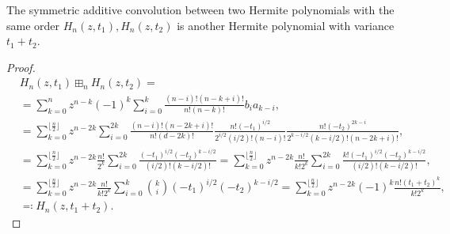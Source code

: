 \begin{proposition}
The symmetric additive convolution between two Hermite polynomials with the same order $H_n(z,t_1), H_n(z,t_2)$ is another Hermite polynomial with variance $t_1 + t_2$.
\end{proposition}

\begin{proof}
    \begin{align*}
        &H_n(z,t_1) \boxplus_n H_n(z,t_2) = \\ 
        &= \sum_{k=0}^n z^{n-k}(-1)^k \sum_{i=0}^k \frac{(n-i)!(n-k+i)!}{n!(n-k)!} b_i a_{k-i}, \\ 
        &= \sum_{k=0}^{\lfloor \frac n2 \rfloor} z^{n-2k} \sum_{i=0}^{2k} \frac{(n-i)!(n-2k+i)!}{n!(d-2k)!} \frac{n!(-t_1)^{i/2}}{2^{i/2} (i/2)! (n-i)!} \frac{n!(-t_2)^{2k-i}}{2^{k-i/2} (k-i/2)! (n-2k+i)!},\\ 
        &= \sum_{k=0}^{\lfloor \frac n2 \rfloor} z^{n-2k}\frac{n!}{2^k} \sum_{i=0}^{2k} \frac{(-t_1)^{i/2}(-t_2)^{k-i/2}}{(i/2)!(k-i/2)!} = \sum_{k=0}^{\lfloor \frac n2 \rfloor} z^{n-2k} \frac{n!}{k!2^k} \sum_{i=0}^{2k} \frac{k!(-t_1)^{i/2}(-t_2)^{k-i/2}}{(i/2)!(k-i/2)!}, \\ 
        &= \sum_{k=0}^{\lfloor \frac n2 \rfloor} z^{n-2k}\frac{n!}{k!2^k} \sum_{i=0}^{k} \binom{k}{i}(-t_1)^{i/2}(-t_2)^{k-i/2} = \sum_{k=0}^{\lfloor \frac n2 \rfloor} z^{n-2k}(-1)^{k} \frac{n!(t_1 + t_2)^k }{k!2^k},\\ 
        &\eqcolon H_n(z,t_1+t_2).
    \end{align*}\end{proof}

